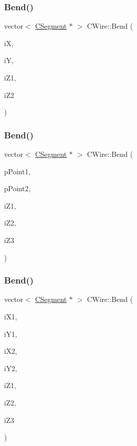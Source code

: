 \mbox{\label{classCWire_a1eb748fc072c27d1f1da942efe109823}} 
\subsubsection{\texorpdfstring{Bend()}{Bend()}\hspace{0.1cm}{\footnotesize\ttfamily [3/5]}}
{\footnotesize\ttfamily vector$<$ \mbox{\hyperlink{classCSegment}{C\+Segment}} $\ast$ $>$ C\+Wire\+::\+Bend (\begin{DoxyParamCaption}\item[{int}]{iX,  }\item[{int}]{iY,  }\item[{int}]{i\+Z1,  }\item[{int}]{i\+Z2 }\end{DoxyParamCaption})}

\mbox{\label{classCWire_a5e7f3f872777c728db89921f49bef82c}} 
\subsubsection{\texorpdfstring{Bend()}{Bend()}\hspace{0.1cm}{\footnotesize\ttfamily [4/5]}}
{\footnotesize\ttfamily vector$<$ \mbox{\hyperlink{classCSegment}{C\+Segment}} $\ast$ $>$ C\+Wire\+::\+Bend (\begin{DoxyParamCaption}\item[{\mbox{\hyperlink{classCPoint}{C\+Point}} $\ast$}]{p\+Point1,  }\item[{\mbox{\hyperlink{classCPoint}{C\+Point}} $\ast$}]{p\+Point2,  }\item[{int}]{i\+Z1,  }\item[{int}]{i\+Z2,  }\item[{int}]{i\+Z3 }\end{DoxyParamCaption})}

\mbox{\label{classCWire_a1ffc3243c96850451394c2b121705585}} 
\subsubsection{\texorpdfstring{Bend()}{Bend()}\hspace{0.1cm}{\footnotesize\ttfamily [5/5]}}
{\footnotesize\ttfamily vector$<$ \mbox{\hyperlink{classCSegment}{C\+Segment}} $\ast$ $>$ C\+Wire\+::\+Bend (\begin{DoxyParamCaption}\item[{int}]{i\+X1,  }\item[{int}]{i\+Y1,  }\item[{int}]{i\+X2,  }\item[{int}]{i\+Y2,  }\item[{int}]{i\+Z1,  }\item[{int}]{i\+Z2,  }\item[{int}]{i\+Z3 }\end{DoxyParamCaption})}

